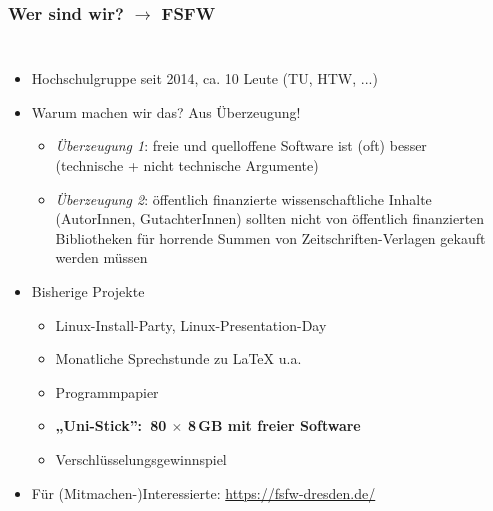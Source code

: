 \documentclass{beamer}
\begin{document}
\begin{frame}[label=ct1]
  \frametitle{Wer sind wir? $\rightarrow$ FSFW}

  \begin{columns}
 
\vspace{-5mm}

  \begin{itemize}
  \item Hochschulgruppe seit 2014, ca. 10 Leute (TU, HTW, ...)
  \item Warum machen wir das? Aus Überzeugung!


  \begin{itemize}
  \item \emph{Überzeugung 1}: freie und quelloffene Software ist (oft) besser\\
    (technische + nicht technische Argumente)\\
    \bigskip
    \pause
  \item \emph{Überzeugung 2}: öffentlich finanzierte wissenschaftliche Inhalte
    (AutorInnen, GutachterInnen) sollten nicht von öffentlich finanzierten
    Bibliotheken für horrende Summen von Zeitschriften-Verlagen gekauft werden
    müssen
  \end{itemize}

    \pause
  \item Bisherige Projekte
    \begin{itemize}
    \item Linux-Install-Party, Linux-Presentation-Day
    \item Monatliche Sprechstunde zu \LaTeX{} u.a.
    \item Programmpapier
    \item \textbf<4-5>{„Uni-Stick”:~80 $\times$ 8\,GB mit freier Software}
    \item Verschlüsselungsgewinnspiel
    \end{itemize}
    \pause
    \pause
    \pause
    \item Für (Mitmachen-)Interessierte: \url{https://fsfw-dresden.de/}
  \end{itemize}
  

\end{columns}
\end{frame}
\end{document}
